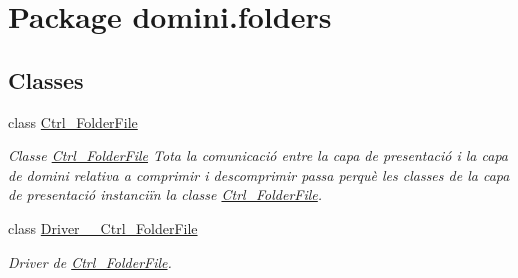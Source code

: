 \hypertarget{namespacedomini_1_1folders}{}\section{Package domini.\+folders}
\label{namespacedomini_1_1folders}
\subsection*{Classes}
\begin{DoxyCompactItemize}
\item 
class \hyperlink{classdomini_1_1folders_1_1Ctrl__FolderFile}{Ctrl\+\_\+\+Folder\+File}
\begin{DoxyCompactList}\small\item\em Classe \hyperlink{classdomini_1_1folders_1_1Ctrl__FolderFile}{Ctrl\+\_\+\+Folder\+File} Tota la comunicació entre la capa de presentació i la capa de domini relativa a comprimir i descomprimir passa perquè les classes de la capa de presentació instanciïn la classe \hyperlink{classdomini_1_1folders_1_1Ctrl__FolderFile}{Ctrl\+\_\+\+Folder\+File}. \end{DoxyCompactList}\item 
class \hyperlink{classdomini_1_1folders_1_1Driver____Ctrl__FolderFile}{Driver\+\_\+\+\_\+\+Ctrl\+\_\+\+Folder\+File}
\begin{DoxyCompactList}\small\item\em Driver de \hyperlink{classdomini_1_1folders_1_1Ctrl__FolderFile}{Ctrl\+\_\+\+Folder\+File}. \end{DoxyCompactList}\end{DoxyCompactItemize}
